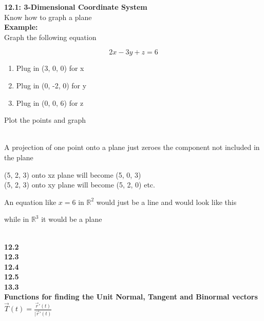 \documentclass{book}
\title {}
\author{}
\date{}
\begin{document}
\textbf{12.1: 3-Dimensional Coordinate System}\\
Know how to graph a plane\\
\textbf{Example:}\\ Graph the following equation

\[2x-3y+z = 6\]

\begin{enumerate}
    \item{Plug in (3, 0, 0) for x}
    \item{Plug in (0, -2, 0) for y}
    \item{Plug in (0, 0, 6) for z}
\end{enumerate}
Plot the points and graph

\\A projection of one point onto a plane just zeroes the component not included in the plane
\begin{center}
    (5, 2, 3) onto xz plane will become (5, 0, 3)\\
    (5, 2, 3) onto xy plane will become (5, 2, 0) etc.
\end{center}


An equation like $x=6$ in 
$\mathbb{R}^2$ would just be a line and would look like this
while in $\mathbb{R}^3$ it would be a plane

\\
\textbf{12.2}
\\
\textbf{12.3}
\\
\textbf{12.4}
\\
\textbf{12.5}
\\
\textbf{13.3}
\\     
\textbf{Functions for finding the Unit Normal, Tangent and Binormal vectors}
\\
$\vec{T}(t) = \frac{\vec{r}'(t)}{\vert \vec{r}'(t)}$
\end{document}
